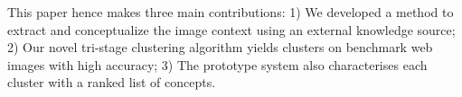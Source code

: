 This paper hence makes three main contributions:
1) We developed a method to extract and conceptualize the image context
using an external knowledge source;
2) Our novel tri-stage clustering algorithm yields clusters on
benchmark web images with high accuracy;
3) The prototype system also characterises each cluster with a
ranked list of concepts.
%



